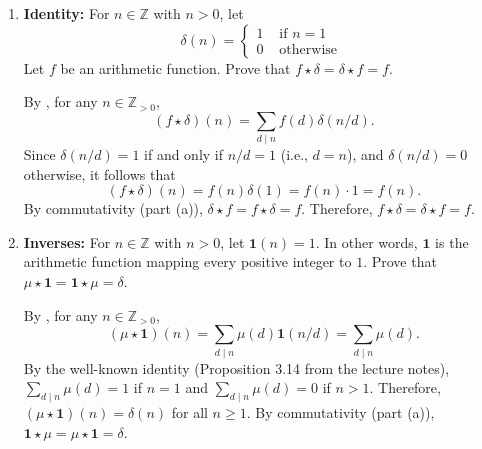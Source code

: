 \begin{enumerate}
\begin{enumerate}
    \item \textbf{Identity:} For $n \in \mathbb{Z}$ with $n>0$, let
    \[
    \delta(n)= \begin{cases}1 & \text { if } n=1 \\ 0 & \text { otherwise }\end{cases}
    \]
    Let $f$ be an arithmetic function. Prove that $f \star \delta=\delta \star f=f$.
    \begin{subprove}
      By , for any $n \in \mathbb{Z}_{>0}$,
      \[
      (f \star \delta)(n) = \sum_{d \mid n} f(d) \delta(n/d).
      \]
      Since $\delta(n/d) = 1$ if and only if $n/d = 1$ (i.e., $d = n$), and $\delta(n/d) = 0$ otherwise, it follows that
      \[
      (f \star \delta)(n) = f(n) \delta(1) = f(n) \cdot 1 = f(n).
      \]
      By commutativity (part (a)), $\delta \star f = f \star \delta = f$. Therefore, $f \star \delta = \delta \star f = f$.
    \end{subprove}

    \item \textbf{Inverses:} For $n \in \mathbb{Z}$ with $n>0$, let $\mathbf{1}(n)=1$. In other words, $\mathbf{1}$ is the arithmetic function mapping every positive integer to $1$. Prove that $\mu \star \mathbf{1}=\mathbf{1} \star \mu=\delta$.
    \begin{subprove}
      By , for any $n \in \mathbb{Z}_{>0}$,
      \[
      (\mu \star \mathbf{1})(n) = \sum_{d \mid n} \mu(d) \mathbf{1}(n/d) = \sum_{d \mid n} \mu(d).
      \]
      By the well-known identity (Proposition 3.14 from the lecture notes), $\sum_{d \mid n} \mu(d) = 1$ if $n=1$ and $\sum_{d \mid n} \mu(d) = 0$ if $n>1$.
      Therefore, $(\mu \star \mathbf{1})(n) = \delta(n)$ for all $n \geq 1$.
      By commutativity (part (a)), $\mathbf{1} \star \mu = \mu \star \mathbf{1} = \delta$.
    \end{subprove}


\end{enumerate}
\end{enumerate}
